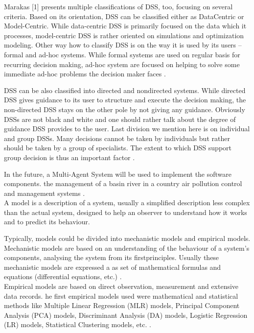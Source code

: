 \documentclass[letterpaper, 10 pt, conference]{ieeeconf}  %
\begin{document}
Marakas [1] presents multiple classifications of DSS, too, focusing on several criteria. Based on its orientation, DSS can be classified either as DataCentric or Model-Centric. While data-centric DSS is primarily focused on the data which it processes, model-centric DSS is rather oriented on simulations and optimization modeling. Other way how to classify DSS is on the way it is used by its users – formal and ad-hoc systems. While formal systems are used on regular basis for recurring decision making, ad-hoc system are focused on helping to solve some immediate ad-hoc problems the decision maker faces \cite{KOvZIvSEK}.

DSS can be also classified into directed and nondirected systems. While directed DSS gives guidance to its user to structure and execute the decision making, the non-directed DSS stays on the other pole by not giving any guidance. Obviously DSSs are not black and white and one should rather talk about the degree of guidance DSS provides to the user. Last division we mention here is on individual and group DSSs. Many decisions cannot be taken by individuals but rather should be taken by a group of specialists. The extent to which DSS support group decision is thus an important factor \cite{KOvZIvSEK}.

In the future, a Multi-Agent System will be used to implement the software components. the management of a basin river in a country air pollution control and management systems  \cite{S`anchez-Marr`e2014}.\\

A model is a description of a system, usually a simplified description less complex than the actual system, designed to help an observer to understand how it works and to predict its behaviour.

Typically, models could be divided into mechanistic models and empirical models. Mechanistic models are based on an understanding of the behaviour of a system's components, analysing the system from its firstprinciples. Usually these mechanistic models are expressed a as set of mathematical formulas and equations (differential equations, etc.)  \cite{S`anchez-Marr`e2014}.\\

Empirical models are based on direct observation, measurement and extensive data records.
he first empirical models used were mathematical and statistical methods like Multiple Linear Regression (MLR) models, Principal Component Analysis (PCA) models, Discriminant Analysis (DA) models, Logistic Regression (LR)
models, Statistical Clustering models, etc.  \cite{S`anchez-Marr`e2014}.\\
\end{document}
